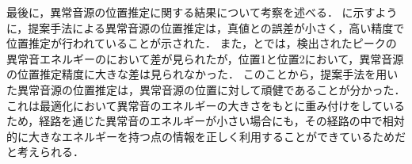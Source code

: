\documentclass[../main]{subfiles}
\begin{document}
最後に，異常音源の位置推定に関する結果について考察を述べる．
に示すように，提案手法による異常音源の位置推定は，真値との誤差が小さく，高い精度で位置推定が行われていることが示された．
また，とでは，検出されたピークの異常音エネルギーのにおいて差が見られたが，位置1と位置2において，異常音源の位置推定精度に大きな差は見られなかった．
このことから，提案手法を用いた異常音源の位置推定は，異常音源の位置に対して頑健であることが分かった．これは最適化において異常音のエネルギーの大きさをもとに重み付けをしているため，経路を通じた異常音のエネルギーが小さい場合にも，その経路の中で相対的に大きなエネルギーを持つ点の情報を正しく利用することができているためだと考えられる．
\end{document}
